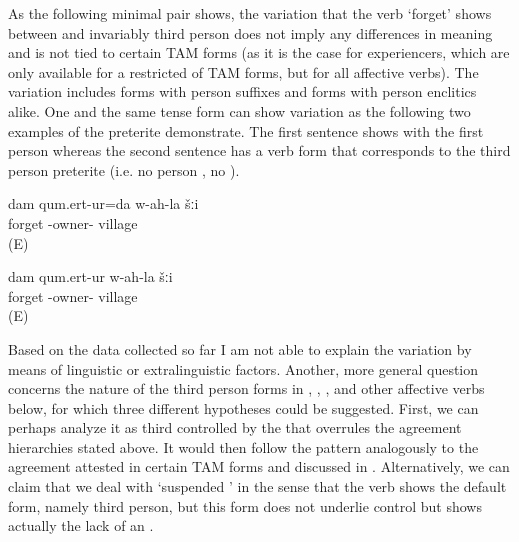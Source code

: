As the following minimal pair shows, the variation that the verb `forget' shows between  and invariably third person does not imply any differences in meaning and is not tied to certain TAM forms (as it is the case for  experiencers, which are only available for a restricted  of TAM forms, but for all affective verbs). The variation includes forms with person suffixes and forms with person enclitics alike. One and the same tense form can show variation as the following two examples of the preterite demonstrate. The first sentence  shows  with the first person  whereas the second sentence  has a verb form that corresponds to the third person preterite (i.e. no person , no ). 

\begin{exe}
	\ex	\label{ex:I (masc.) forgot my own village.A}
	\gll	dam qum.ert-ur=da w-ah-la šːi\\
	 	forget -owner- village\\
	\glt	{} (E)

	\ex	\label{ex:I (masc.) forgot my own village.B}
	\gll	dam qum.ert-ur w-ah-la šːi\\
		 	forget -owner- village\\
	\glt	{} (E)
\end{exe}

Based on the data collected so far I am not able to explain the variation by means of linguistic or extralinguistic factors. Another, more general question concerns the nature of the third person forms in , , , and other affective verbs below, for which three different hypotheses could be suggested. First, we can perhaps analyze it as third  controlled by the   that overrules the agreement hierarchies stated above. It would then follow the  pattern analogously to the  agreement attested in certain TAM forms and discussed in . Alternatively, we can claim that we deal with `suspended ' in the sense that the verb shows the default  form, namely third person, but this form does not underlie control but shows actually the lack of an . 

